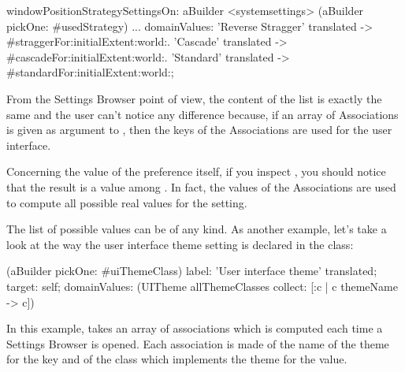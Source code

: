 \documentclass[a4paper,10pt,twoside]{book}
\begin{document}
\begin{code}{}
windowPositionStrategySettingsOn: aBuilder
	<systemsettings> 
	(aBuilder pickOne: #usedStrategy)
	...
	domainValues: {'Reverse Stragger' translated -> #straggerFor:initialExtent:world:. 'Cascade' translated -> #cascadeFor:initialExtent:world:. 'Standard' translated -> #standardFor:initialExtent:world:};
\end{code}

From the Settings Browser point of view, the content of the list is exactly the same and the user can't notice any difference because, if an array of Associations is given as argument to , then the keys of the Associations are used for the user interface. 

Concerning the value of the preference itself, if you inspect , you should notice that the result is a value among . In fact, the values of the Associations are used to compute all possible real values for the setting.

The list of possible values can be of any kind. As another example, let's take a look at the way the user interface theme setting is declared in the  class:
\begin{code}{}
(aBuilder pickOne: #uiThemeClass)
	label: 'User interface theme' translated;
	target: self;
	domainValues: (UITheme allThemeClasses collect: [:c | c themeName -> c])
\end{code}
In this example,  takes an array of associations which is computed each time a Settings Browser is opened. Each association is made of the name of the theme for the key and of the class which implements the theme for the value.
\end{document}
